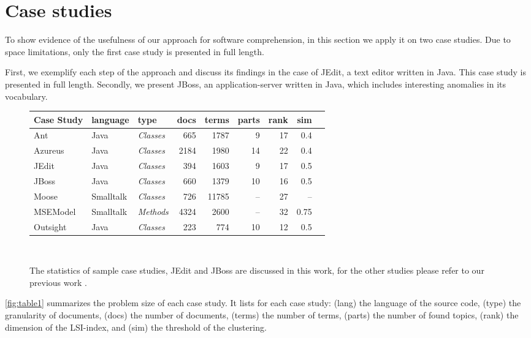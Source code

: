 \section{Case studies}\label{sec:validation}

To show evidence of the usefulness of our approach for software comprehension, in this section we apply it on two case studies. Due to space limitations, only the first case study is presented in full length.

First, we exemplify each step of the approach and discuss its findings in the case of JEdit, a text editor written in Java. This case study is presented in full length. Secondly, we present JBoss, an application-server written in Java, which includes interesting anomalies in its vocabulary.

\begin{figure}[h]
\centering
{\scriptsize
\begin{tabular}{l|llrrrrrr}
\hline
\textbf{Case Study}&\textbf{language}&\textbf{type}&\textbf{docs}&\textbf{terms}
&\textbf{parts}&\textbf{rank}&\textbf{sim}\\
\hline
Ant & Java & \emph{Classes} & 665 & 1787 & 9 & 17 & 0.4\\
Azureus & Java & \emph{Classes}       & 2184 & 1980 & 14 & 22 & 0.4\\
JEdit & Java & \emph{Classes}       & 394  & 1603 & 9 & 17 & 0.5\\
JBoss & Java & \emph{Classes}       & 660 & 1379 & 10 & 16 & 0.5\\
Moose\footnotemark{} & Smalltalk & \emph{Classes}  & 726  & 11785 & -- & 27 & --\\
MSEModel & Smalltalk & \emph{Methods}  & 4324  & 2600 & -- & 32 & 0.75\\
Outsight & Java & \emph{Classes}    & 223 & 774 & 10 & 12 & 0.5\\
\hline
\end{tabular}}\\
\caption{The statistics of sample case studies, JEdit and JBoss are discussed in this work, for the other studies please refer to our previous work \cite{Kuhn05a,Kuhn06a}.}\label{fig:table1}
\end{figure}

\autoref{fig:table1} summarizes the problem size of each case study. It lists for each case study: (lang) the language of the source code, (type) the granularity of  documents, (docs) the number of documents, (terms) the number of terms, (parts) the number of found topics, (rank) the dimension of the LSI-index, and (sim) the threshold  of the clustering.

